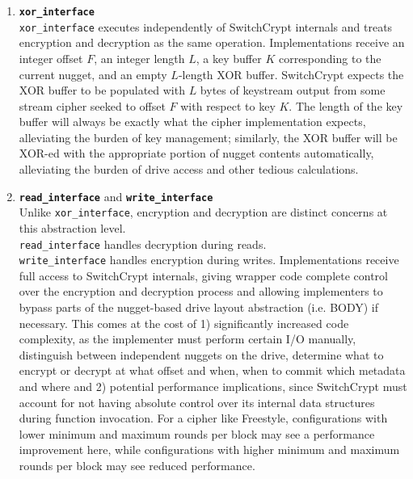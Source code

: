 \begin{enumerate}
   \item \textbf{\texttt{xor\_interface}}\\\texttt{xor\_interface} executes
   independently of SwitchCrypt internals and treats encryption and decryption
   as the same operation. Implementations receive an integer offset $F$, an
   integer length $L$, a key buffer $K$ corresponding to the current nugget, and
   an empty $L$-length XOR buffer. SwitchCrypt expects the XOR buffer to be
   populated with $L$ bytes of keystream output from some stream cipher seeked
   to offset $F$ with respect to key $K$. The length of the key buffer will
   always be exactly what the cipher implementation expects, alleviating the
   burden of key management; similarly, the XOR buffer will be XOR-ed with the
   appropriate portion of nugget contents automatically, alleviating the burden
   of drive access and other tedious calculations. \\
   \item \textbf{\texttt{read\_interface}} and
   \textbf{\texttt{write\_interface}}\\
   Unlike \texttt{xor\_interface}, encryption and decryption are distinct
   concerns at this abstraction level. \\\texttt{read\_interface} handles
   decryption during reads. \\\texttt{write\_interface} handles encryption
   during writes. Implementations receive full access to SwitchCrypt internals,
   giving wrapper code complete control over the encryption and decryption
   process and allowing implementers to bypass parts of the nugget-based drive
   layout abstraction (i.e. BODY) if necessary. This comes at the cost of 1)
   significantly increased code complexity, as the implementer must perform
   certain I/O manually, distinguish between independent nuggets on the drive,
   determine what to encrypt or decrypt at what offset and when, when to commit
   which metadata and where and 2) potential performance implications, since
   SwitchCrypt must account for not having absolute control over its internal
   data structures during function invocation. For a cipher like Freestyle,
   configurations with lower minimum and maximum rounds per block may see a
   performance improvement here, while configurations with higher minimum and
   maximum rounds per block may see reduced performance.
\end{enumerate}

